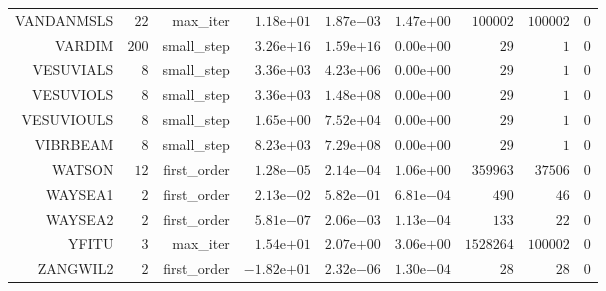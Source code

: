\begin{longtable}{rrrrrrrrr}
VANDANMSLS & \(    22\) & max\_iter & \( 1.18\)e\(+01\) & \( 1.87\)e\(-03\) & \( 1.47\)e\(+00\) & \(100002\) & \(100002\) & \(     0\) \\
VARDIM & \(   200\) & small\_step & \( 3.26\)e\(+16\) & \( 1.59\)e\(+16\) & \( 0.00\)e\(+00\) & \(    29\) & \(     1\) & \(     0\) \\
VESUVIALS & \(     8\) & small\_step & \( 3.36\)e\(+03\) & \( 4.23\)e\(+06\) & \( 0.00\)e\(+00\) & \(    29\) & \(     1\) & \(     0\) \\
VESUVIOLS & \(     8\) & small\_step & \( 3.36\)e\(+03\) & \( 1.48\)e\(+08\) & \( 0.00\)e\(+00\) & \(    29\) & \(     1\) & \(     0\) \\
VESUVIOULS & \(     8\) & small\_step & \( 1.65\)e\(+00\) & \( 7.52\)e\(+04\) & \( 0.00\)e\(+00\) & \(    29\) & \(     1\) & \(     0\) \\
VIBRBEAM & \(     8\) & small\_step & \( 8.23\)e\(+03\) & \( 7.29\)e\(+08\) & \( 0.00\)e\(+00\) & \(    29\) & \(     1\) & \(     0\) \\
WATSON & \(    12\) & first\_order & \( 1.28\)e\(-05\) & \( 2.14\)e\(-04\) & \( 1.06\)e\(+00\) & \(359963\) & \( 37506\) & \(     0\) \\
WAYSEA1 & \(     2\) & first\_order & \( 2.13\)e\(-02\) & \( 5.82\)e\(-01\) & \( 6.81\)e\(-04\) & \(   490\) & \(    46\) & \(     0\) \\
WAYSEA2 & \(     2\) & first\_order & \( 5.81\)e\(-07\) & \( 2.06\)e\(-03\) & \( 1.13\)e\(-04\) & \(   133\) & \(    22\) & \(     0\) \\
YFITU & \(     3\) & max\_iter & \( 1.54\)e\(+01\) & \( 2.07\)e\(+00\) & \( 3.06\)e\(+00\) & \(1528264\) & \(100002\) & \(     0\) \\
ZANGWIL2 & \(     2\) & first\_order & \(-1.82\)e\(+01\) & \( 2.32\)e\(-06\) & \( 1.30\)e\(-04\) & \(    28\) & \(    28\) & \(     0\) \\\hline
\end{longtable}
